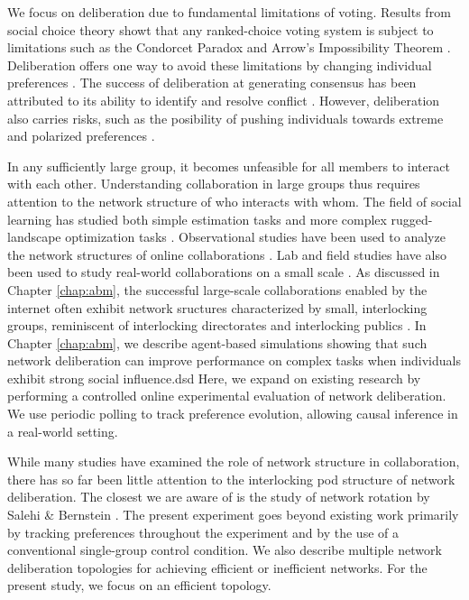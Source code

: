 We focus on deliberation due to fundamental limitations of voting.
Results from social choice theory showt that any ranked-choice voting system is subject to limitations such as the Condorcet Paradox \cite{condorcet_essay_1785} and Arrow's Impossibility Theorem \cite{arrow_social_2012}.
Deliberation offers one way to avoid these limitations by changing individual preferences \cite{ackerman_deliberation_2002}.
The success of deliberation at generating consensus has been attributed to its ability to identify and resolve conflict \cite{gentry_consensus_1982}.
However, deliberation also carries risks, such as the posibility of pushing individuals towards extreme and polarized preferences \cite{schkade_what_2007}.

In any sufficiently large group, it becomes unfeasible for all members to interact with each other.
Understanding collaboration in large groups thus requires attention to the network structure of who interacts with whom.
The field of social learning has studied both simple estimation tasks \cite{degroot_reaching_1974, golub_naive_2010} and more complex rugged-landscape optimization tasks \cite{lazer_network_2007, barkoczi_social_2016}.
Observational studies have been used to analyze the network structures of online collaborations \cite{gonzalez-bailon_networked_2016, platt_network_2018}.
Lab and field studies have also been used to study real-world collaborations on a small scale \cite{salehi_hive_2018, kearns_experiments_2012}.
As discussed in Chapter \ref{chap:abm}, the successful large-scale collaborations enabled by the internet often exhibit network sructures characterized by small, interlocking groups, reminiscent of interlocking directorates \cite{levine_study_1979} and interlocking publics \cite{habermas_structural_1991}.
In Chapter \ref{chap:abm}, we describe agent-based simulations showing that such network deliberation can improve performance on complex tasks when individuals exhibit strong social influence.dsd
Here, we expand on existing research by performing a controlled online experimental evaluation of network deliberation.
We use periodic polling to track preference evolution, allowing causal inference in a real-world setting.

While many studies have examined the role of network structure in collaboration, there has so far been little attention to the interlocking pod structure of network deliberation.
The closest we are aware of is the study of network rotation by Salehi \& Bernstein \cite{salehi_hive_2018}.
The present experiment goes beyond existing work primarily by tracking preferences throughout the experiment and by the use of a conventional single-group control condition.
We also describe multiple network deliberation topologies for achieving efficient or inefficient networks.
For the present study, we focus on an efficient topology.

